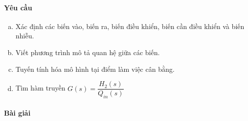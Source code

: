 \documentclass[12pt,a4paper]{article}
\begin{document}
    \paragraph{Yêu cầu}
        \begin{enumerate}[a.]
            \item Xác định các biến vào, biến ra, biến điều khiển, biến cần điều khiển và biến nhiễu.
            \item Viết phương trình mô tả quan hệ giữa các biến.
            \item Tuyến tính hóa mô hình tại điểm làm việc cân bằng.
            \item Tìm hàm truyền $G(s) = \dfrac{H_2(s)}{Q_{in}(s)}$
        \end{enumerate}

    \paragraph{Bài giải}
\end{document}
